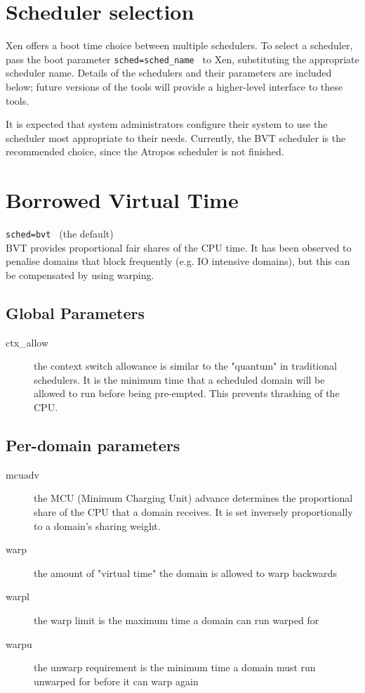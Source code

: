 \documentclass[11pt,twoside,final,openright]{xenstyle}
\begin{document}
{\section{Scheduler selection}

Xen offers a boot time choice between multiple schedulers.  To select
a scheduler, pass the boot parameter { \tt sched=sched\_name } to Xen,
substituting the appropriate scheduler name.  Details of the schedulers
and their parameters are included below; future versions of the tools
will provide a higher-level interface to these tools.

It is expected that system administrators configure their system to
use the scheduler most appropriate to their needs.  Currently, the BVT
scheduler is the recommended choice, since the Atropos scheduler is
not finished.

\section{Borrowed Virtual Time}

{\tt sched=bvt } (the default) \\ 

BVT provides proportional fair shares of the CPU time.  It has been
observed to penalise domains that block frequently (e.g. IO intensive
domains), but this can be compensated by using warping. 

\subsection{Global Parameters}

\begin{description}
\item[ctx\_allow]
  the context switch allowance is similar to the "quantum"
  in traditional schedulers.  It is the minimum time that
  a scheduled domain will be allowed to run before being
  pre-empted.  This prevents thrashing of the CPU.
\end{description}

\subsection{Per-domain parameters}

\begin{description}
\item[mcuadv]
  the MCU (Minimum Charging Unit) advance determines the
  proportional share of the CPU that a domain receives.  It
  is set inversely proportionally to a domain's sharing weight.
\item[warp]
  the amount of "virtual time" the domain is allowed to warp
  backwards
\item[warpl]
  the warp limit is the maximum time a domain can run warped for
\item[warpu]
  the unwarp requirement is the minimum time a domain must
  run unwarped for before it can warp again
\end{description}

}
\end{document}
